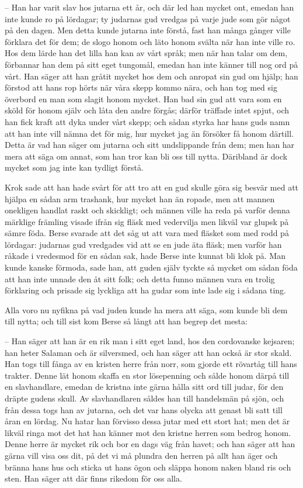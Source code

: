 – Han har varit slav hos jutarna ett år, och där led han mycket ont, emedan han inte kunde ro på lördagar; ty judarnas gud vredgas på varje jude som gör något på den dagen. Men detta kunde jutarna inte förstå, fast han många gånger ville förklara det för dem; de slogo honom och läto honom svälta när han inte ville ro. Hos dem lärde han det lilla han kan av vårt språk; men när han talar om dem, förbannar han dem på sitt eget tungomål, emedan han inte känner till nog ord på vårt. Han säger att han gråtit mycket hos dem och anropat sin gud om hjälp; han förstod att hans rop hörts när våra skepp kommo nära, och han tog med sig överbord en man som slagit honom mycket. Han bad sin gud att vara som en sköld för honom själv och låta den andre förgås; därför träffade intet spjut, och han fick kraft att dyka under vårt skepp; och sådan styrka har hans guds namn att han inte vill nämna det för mig, hur mycket jag än försöker få honom därtill. Detta är vad han säger om jutarna och sitt undslippande från dem; men han har mera att säga om annat, som han tror kan bli oss till nytta. Däribland är dock mycket som jag inte kan tydligt förstå.

\initial Krok sade att han hade svårt för att tro att en gud skulle göra sig besvär med att hjälpa en sådan arm trashank, hur mycket han än ropade, men att mannen onekligen handlat raskt och skickligt; och männen ville ha reda på varför denna märklige främling visade ifrån sig fläsk med vedervilja men likväl var glupsk på sämre föda. Berse svarade att det såg ut att vara med fläsket som med rodd på lördagar: judarnas gud vredgades vid att se en jude äta fläsk; men varför han råkade i vredesmod för en sådan sak, hade Berse inte kunnat bli klok på. Man kunde kanske förmoda, sade han, att guden själv tyckte så mycket om sådan föda att han inte unnade den åt sitt folk; och detta funno männen vara en trolig förklaring och prisade sig lyckliga att ha gudar som inte lade sig i sådana ting.

\initial Alla voro nu nyfikna på vad juden kunde ha mera att säga, som kunde bli dem till nytta; och till sist kom Berse så långt att han begrep det mesta:

– Han säger att han är en rik man i sitt eget land, hos den cordovanske kejsaren; han heter Salaman och är silversmed, och han säger att han också är stor skald. Han togs till fånga av en kristen herre från norr, som gjorde ett rövartåg till hans trakter. Denne lät honom skaffa en stor lösepenning och sålde honom därpå till en slavhandlare, emedan de kristna inte gärna hålla sitt ord till judar, för den dräpte gudens skull. Av slavhandlaren såldes han till handelsmän på sjön, och från dessa togs han av jutarna, och det var hans olycka att genast bli satt till åran en lördag. Nu hatar han förvisso dessa jutar med ett stort hat; men det är likväl ringa mot det hat han känner mot den kristne herren som bedrog honom. Denne herre är mycket rik och bor en dags väg från havet; och han säger att han gärna vill visa oss dit, på det vi må plundra den herren på allt han äger och bränna hans hus och sticka ut hans ögon och släppa honom naken bland ris och sten. Han säger att där finns rikedom för oss alla.

